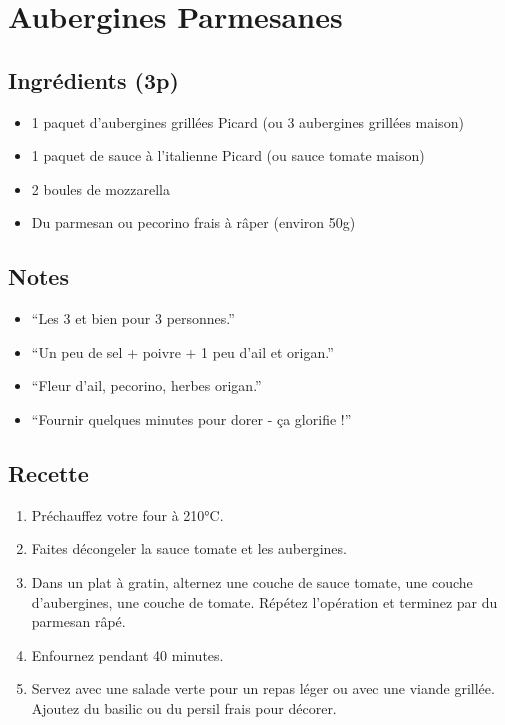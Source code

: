 \section{Aubergines Parmesanes}\label{aubergines-parmesanes}

\subsection{Ingrédients (3p)}\label{ingruxe9dients-3p}

\begin{itemize}

\item
  1 paquet d'aubergines grillées Picard (ou 3 aubergines grillées
  maison)
\item
  1 paquet de sauce à l'italienne Picard (ou sauce tomate maison)
\item
  2 boules de mozzarella
\item
  Du parmesan ou pecorino frais à râper (environ 50g)
\end{itemize}

\subsection{Notes}\label{notes}

\begin{itemize}

\item
  ``Les 3 et bien pour 3 personnes.''
\item
  ``Un peu de sel + poivre + 1 peu d'ail et origan.''
\item
  ``Fleur d'ail, pecorino, herbes origan.''
\item
  ``Fournir quelques minutes pour dorer - ça glorifie !''
\end{itemize}

\subsection{Recette}\label{recette}

\begin{enumerate}
\def\labelenumi{\arabic{enumi}.}

\item
  Préchauffez votre four à 210°C.
\item
  Faites décongeler la sauce tomate et les aubergines.
\item
  Dans un plat à gratin, alternez une couche de sauce tomate, une couche
  d'aubergines, une couche de tomate. Répétez l'opération et terminez
  par du parmesan râpé.
\item
  Enfournez pendant 40 minutes.
\item
  Servez avec une salade verte pour un repas léger ou avec une viande
  grillée. Ajoutez du basilic ou du persil frais pour décorer.
\end{enumerate}

